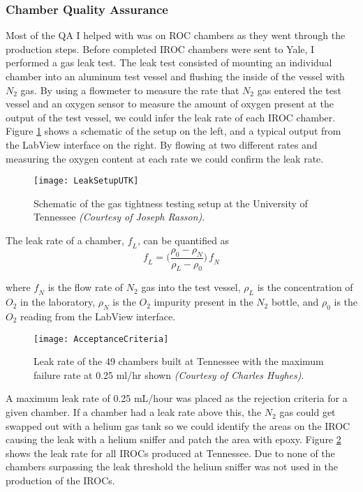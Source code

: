 \subsubsection{Chamber Quality Assurance}

Most of the QA I helped with was on ROC chambers as they went through the production steps.  Before completed IROC chambers were sent to Yale, I performed a gas leak test.  The leak test consisted of mounting an individual chamber into an aluminum test vessel and flushing the inside of the vessel with $N_{2}$ gas.  By using a flowmeter to measure the rate that $N_{2}$ gas entered the test vessel and an oxygen sensor to measure the amount of oxygen present at the output of the test vessel, we could infer the leak rate of each IROC chamber.  Figure \ref{fig:LeakTest} shows a schematic of the setup on the left, and a typical output from the LabView interface on the right.  By flowing at two different rates and measuring the oxygen content at each rate we could confirm the leak rate.

\begin{figure}[t!]
\texttt{[image: LeakSetupUTK]}
\centering
\caption{Schematic of the gas tightness testing setup at the University of Tennessee \textit{(Courtesy of Joseph Rasson)}. }
\label{fig:LeakTest}
\end{figure}


The leak rate of a chamber, $\mathit{f_{L}}$,  can be quantified as
\begin{equation}
\mathit{f_{L}} =\Bigg(  \frac{\rho_{0} -\rho_{N}}{\rho_{L} -\rho_{0}} \Bigg) \,  \mathit{f_{N}}
\label{eq:leakrate}
\end{equation}

\noindent
where $\mathit{f_{N}}$ is the flow rate of $N_{2}$ gas into the test vessel, $\rho_{L}$ is the concentration of $O_{2}$ in the laboratory, $\rho_{N}$ is the $O_{2}$ impurity present in the $N_{2}$ bottle, and $\rho_{0}$ is the $O_{2}$ reading from the LabView interface.  

\begin{figure}[t!]
\texttt{[image: AcceptanceCriteria]}
\centering
\caption{Leak rate of the 49 chambers built at Tennessee with the maximum failure rate at 0.25 ml/hr shown \textit{(Courtesy of Charles Hughes)}. }
\label{fig:IROCLeaK}
\end{figure}

\noindent
A maximum leak rate of 0.25 mL/hour was placed as the rejection criteria for a given chamber.  If a chamber had a leak rate above this, the $N_{2}$ gas could get swapped out with a helium gas tank so we could identify the areas on the IROC causing the leak with a helium sniffer and patch the area with epoxy.  Figure \ref{fig:IROCLeaK} shows the leak rate for all IROCs produced at Tennessee.  Due to none of the chambers surpassing the leak threshold the helium sniffer was not used in the production of the IROCs. 


